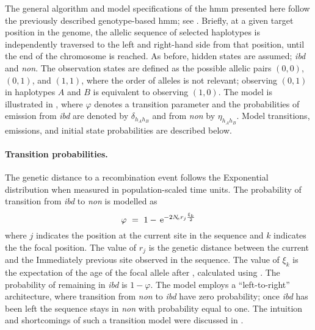 The general algorithm and model specifications of the \gls{hmm} presented here follow the previously described genotype-based \gls{hmm}; see .
Briefly, at a given target position in the genome, the allelic sequence of  selected haplotypes is independently traversed to the left and right-hand side from that position, until the end of the chromosome is reached.
As before,  hidden states are assumed; \emph{ibd} and \emph{non}.
The observation states are defined as the possible allelic pairs $(0,0)$, $(0,1)$, and $(1,1)$, where the order of alleles is not relevant; \ie observing $(0,1)$ in haplotypes $A$ and $B$ is equivalent to observing $(1,0)$.
The model is illustrated in , where $\varphi$ denotes a transition parameter and the probabilities of emission from \emph{ibd} are denoted by $\delta_{h_A h_B}$ and from \emph{non} by $\eta_{h_A h_B}$.
Model transitions, emissions, and initial state probabilities are described below.


%

%

\paragraph{Transition probabilities.}
The genetic distance to a recombination event follows the Exponential distribution when measured in population-scaled time units.
The probability of transition from \emph{ibd} to \emph{non} is modelled as
\begin{equation}\label{eq:hmm_trans_prob}
	\varphi ~=~
	1 - \,\mathrm{e}^{-2N_{\!e} r_j \frac{\xi_k}{2}}
\end{equation}
where $j$ indicates the position at the current site in the sequence and $k$ indicates the the focal position.
The value of $r_j$ is the genetic distance between the current and the Immediately previous site observed in the sequence.
The value of $\xi_k$ is the expectation of the age of the focal allele after \citet{Kimura:1973ug}, calculated using .
The probability of remaining in \emph{ibd} is ${1-\varphi}$.
The model employs a ``left-to-right'' architecture, where transition from \emph{non} to \emph{ibd} have zero probability; \ie once \emph{ibd} has been left the sequence stays in \emph{non} with probability equal to one.
The intuition and shortcomings of such a transition model were discussed in .



